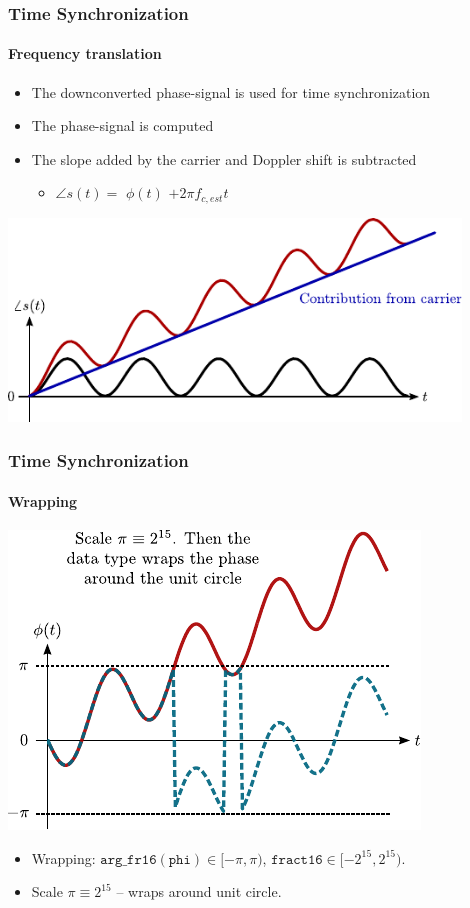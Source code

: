 \begin{frame} \frametitle{Time Synchronization}
    \framesubtitle{Frequency translation}
    \begin{itemize}
        \item The downconverted phase-signal is used for time synchronization
        \item \textcolor{mikred}{The phase-signal is computed}
        \item \textcolor{mikblue}{The slope added by the carrier and Doppler shift is subtracted}
            \begin{itemize}
                \item \textcolor{mikred}{$\angle s(t) =$} $\phi (t)$ \textcolor{mikblue}{$+ 2 \pi f_{c,est} t$}
            \end{itemize}
    \end{itemize}
    \begin{center}
        \includegraphics[width=0.9\textwidth]{img/phase_carrier}
    \end{center}
\end{frame}

\begin{frame}
    \frametitle{Time Synchronization}
    \framesubtitle{Wrapping}
    \begin{center}
        \includegraphics{img/phaseslope}
    \end{center}
    \begin{itemize}
    \item Wrapping: $\mathtt{arg\_fr16(phi)} \in [-\pi,\pi)$, $\mathtt{fract16} \in [-2^{15},2^{15})$.
    \item Scale $\pi \equiv 2^{15}$ -- wraps around unit circle.
    \end{itemize}
\end{frame}

